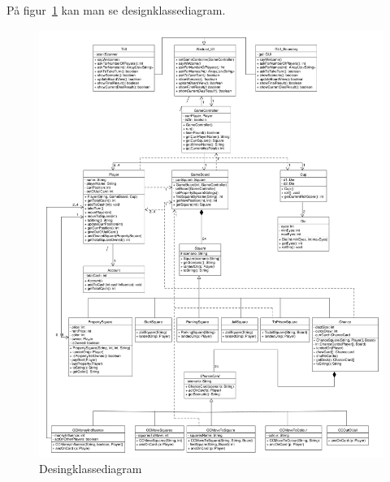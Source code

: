 \documentclass[class=article, crop=false]{standalone}
\begin{document}
På figur~\ref{fig:DKD} kan man se designklassediagram.
    \begin{figure}[H]
        \centering
        \includegraphics[scale = 0.2]{diagrams_png/DKD.pdf}
        \caption{Desingklassediagram}\label{fig:DKD}
    \end{figure}
\end{document}
